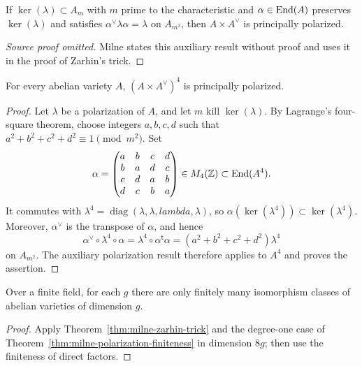 \begin{corollary}\label{cor:milne-zarhin-auxiliary}
If $\ker(\lambda)\subset A_m$ with $m$ prime to the characteristic and $\alpha\in\operatorname{End}(A)$ preserves $\ker(\lambda)$ and satisfies $\alpha^\vee\lambda\alpha=\lambda$ on $A_{m^2}$, then $A\times A^\vee$ is principally polarized.
\end{corollary}
\begin{proof}[Source proof omitted]
Milne states this auxiliary result without proof and uses it in the proof of
Zarhin's trick.
\end{proof}
\begin{theorem}\label{thm:milne-zarhin-trick}
For every abelian variety $A$, $(A\times A^\vee)^4$ is principally polarized.
\end{theorem}

\begin{proof}
Let $\lambda$ be a polarization of $A$, and let $m$ kill $\ker(\lambda)$.
By Lagrange's four-square theorem, choose integers $a,b,c,d$ such that
$a^2+b^2+c^2+d^2\equiv1\pmod {m^2}$.  Set
\[
\alpha=\begin{pmatrix}
a&b&c&d\\ b&a&d&c\\ c&d&a&b\\ d&c&b&a
\end{pmatrix}\in M_4(\mathbb{Z})\subset\operatorname{End}(A^4).
\]
It commutes with $\lambda^4=\operatorname{diag}(\lambda,\lambda,lambda,\lambda)$,
so $\alpha(\ker(\lambda^4))\subset\ker(\lambda^4)$.  Moreover, $\alpha^\vee$
is the transpose of $\alpha$, and hence
\[
\alpha^\vee\circ\lambda^4\circ\alpha
=\lambda^4\circ\alpha^{\mathsf t}\alpha
=(a^2+b^2+c^2+d^2)\lambda^4
\]
on $A_{m^2}$.  The auxiliary polarization result therefore applies to
$A^4$ and proves the assertion.
\end{proof}

\begin{corollary}\label{cor:milne-finite-abelian-varieties}
Over a finite field, for each $g$ there are only finitely many isomorphism classes of abelian varieties of dimension $g$.
\end{corollary}

\begin{proof}

Apply Theorem~\ref{thm:milne-zarhin-trick} and the degree-one case of Theorem~\ref{thm:milne-polarization-finiteness} in dimension $8g$; then use the finiteness of direct factors.

\end{proof}


